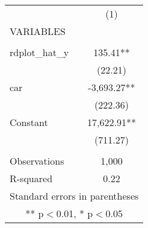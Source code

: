 \begin{tabular}{lc} \hline
 & (1) \\
VARIABLES &  \\ \hline
 &  \\
rdplot\_hat\_y & 135.41** \\
 & (22.21) \\
car & -3,693.27** \\
 & (222.36) \\
Constant & 17,622.91** \\
 & (711.27) \\
 &  \\
Observations & 1,000 \\
 R-squared & 0.22 \\ \hline
\multicolumn{2}{c}{ Standard errors in parentheses} \\
\multicolumn{2}{c}{ ** p$<$0.01, * p$<$0.05} \\
\end{tabular}
